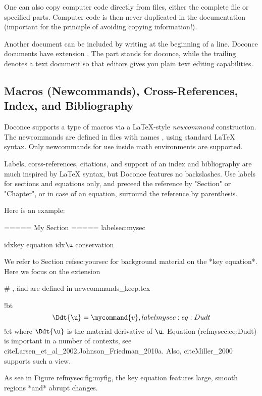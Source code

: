 \documentclass[%
oneside,                 %
final,                   %
10pt]{article}
\begin{document}
One can also copy computer code directly from files, either the
complete file or specified parts.  Computer code is then never
duplicated in the documentation (important for the principle of
avoiding copying information!).

Another document can be included by writing 
at the beginning of a line.  Doconce documents have
extension . The  part stands for doconce, while the
trailing  denotes a text document so that editors gives you
plain text editing capabilities.


\subsection{Macros (Newcommands), Cross-References, Index, and Bibliography}
\label{newcommands}

Doconce supports a type of macros via a LaTeX-style \emph{newcommand}
construction.  The newcommands are defined in files with names
, using standard {\LaTeX} syntax. Only newcommands
for use inside math environments are supported.

Labels, corss-references, citations, and support of an index and
bibliography are much inspired by {\LaTeX} syntax, but Doconce features
no backslashes. Use labels for sections and equations only, and
preceed the reference by "Section" or "Chapter", or in case of
an equation, surround the reference by parenthesis.

Here is an example:

\bccq
===== My Section =====
label{sec:mysec}

idx{key equation} idx{$\u$ conservation}

We refer to Section ref{sec:yoursec} for background material on
the *key equation*. Here we focus on the extension

# \Ddt, \u and \mycommand are defined in newcommands_keep.tex

!bt
\begin{equation}
\Ddt{\u} = \mycommand{v},
label{mysec:eq:Dudt}
\end{equation}
!et
where $\Ddt{\u}$ is the material derivative of $\u$.
Equation (ref{mysec:eq:Dudt}) is important in a number
of contexts, see cite{Larsen_et_al_2002,Johnson_Friedman_2010a}.
Also, cite{Miller_2000} supports such a view.

As see in Figure ref{mysec:fig:myfig}, the key equation
features large, smooth regions *and* abrupt changes.
\end{document}
